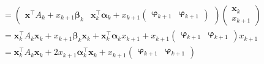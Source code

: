 \documentclass{article}
\begin{document}
\begin{CJK*}{UTF8}{gbsn}
\[
\begin{aligned}
&=
\left(
\begin{array}{cc}
\bm{x}^\top A_k + x_{k + 1}\bm{\beta}_k & \bm{x}_k^\top \bm{\alpha}_k + x_{k + 1}
\left(
\begin{array}{cc}
\bm{\varphi}_{k + 1} & \bm{\varphi}_{k + 1}
\end{array}
\right)
\end{array}
\right)
\left(
\begin{array}{c}
\bm{x}_k \\
x_{k + 1}
\end{array}
\right) \\
&=
\bm{x}_k^\top A_k \bm{x}_k +
x_{k + 1} \bm{\beta}_k \bm{x}_k +
\bm{x}_k^\top \bm{\alpha}_k x_{k + 1} +
x_{k + 1}
\left(
\begin{array}{cc}
\bm{\varphi}_{k + 1} & \bm{\varphi}_{k + 1}
\end{array}
\right)
x_{k + 1} \\
&=
\bm{x}_k^\top A_k\bm{x}_k + 2x_{k + 1}\bm{\alpha}_k^\top\bm{x}_k + x_{k + 1}
\left(
\begin{array}{cc}
\bm{\varphi}_{k + 1} & \bm{\varphi}_{k + 1}
\end{array}
\right)
\end{aligned}
\]



\end{CJK*}
\end{document}
